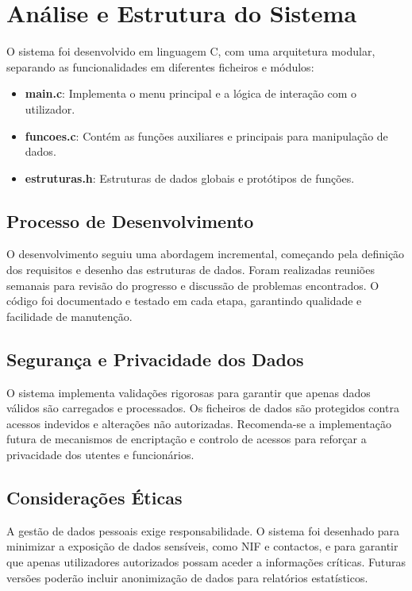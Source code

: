 \documentclass[a4paper,12pt]{report}
\begin{document}
\chapter{Análise e Estrutura do Sistema}
O sistema foi desenvolvido em linguagem C, com uma arquitetura modular, separando as funcionalidades em diferentes ficheiros e módulos:
\begin{itemize}
    \item \textbf{main.c}: Implementa o menu principal e a lógica de interação com o utilizador.
    \item \textbf{funcoes.c}: Contém as funções auxiliares e principais para manipulação de dados.
    \item \textbf{estruturas.h}: Estruturas de dados globais e protótipos de funções.
\end{itemize}

\section{Processo de Desenvolvimento}
O desenvolvimento seguiu uma abordagem incremental, começando pela definição dos requisitos e desenho das estruturas de dados. Foram realizadas reuniões semanais para revisão do progresso e discussão de problemas encontrados. O código foi documentado e testado em cada etapa, garantindo qualidade e facilidade de manutenção.

\section{Segurança e Privacidade dos Dados}
O sistema implementa validações rigorosas para garantir que apenas dados válidos são carregados e processados. Os ficheiros de dados são protegidos contra acessos indevidos e alterações não autorizadas. Recomenda-se a implementação futura de mecanismos de encriptação e controlo de acessos para reforçar a privacidade dos utentes e funcionários.

\section{Considerações Éticas}
A gestão de dados pessoais exige responsabilidade. O sistema foi desenhado para minimizar a exposição de dados sensíveis, como NIF e contactos, e para garantir que apenas utilizadores autorizados possam aceder a informações críticas. Futuras versões poderão incluir anonimização de dados para relatórios estatísticos.
\end{document}
